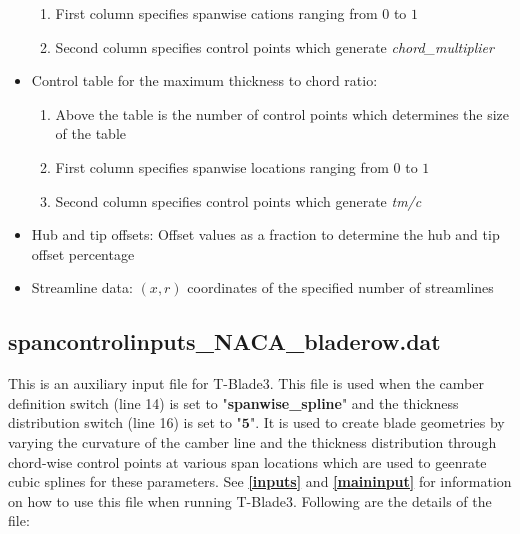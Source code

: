 \documentclass[8pt]{article}
\begin{document}
\begin{itemize}[leftmargin=*]
\begin{enumerate}[label=\alph*]
        \item First column specifies spanwise cations ranging from $0$ to $1$
        \item Second column specifies control points which generate \textit{chord\_multiplier}
    \end{enumerate}
    \item Control table for the maximum thickness to chord ratio:
    \begin{enumerate}[label=\alph*]
        \item Above the table is the number of control points which determines the size of the table
        \item First column specifies spanwise locations ranging from $0$ to $1$
        \item Second column specifies control points which generate \textit{tm/c}
    \end{enumerate}
    \item Hub and tip offsets: Offset values as a fraction to determine the hub and tip offset percentage
    \item Streamline data: $(x,r)$ coordinates of the specified number of streamlines
\end{itemize}

\subsection{spancontrolinputs\_NACA\_bladerow.dat}\label{auxinput_NACA}
\noindent
This is an auxiliary input file for T-Blade3. This file is used when the camber definition switch (line 14) is set to "\textbf{spanwise\_spline}" and the thickness distribution switch (line 16) is set to "$\mathbf{5}$". It is used to create blade geometries by varying the curvature of the camber line and the thickness distribution through chord-wise control points at various span locations which are used to geenrate cubic splines for these parameters. See \textbf{\ref{inputs}} and \textbf{\ref{maininput}} for information on how to use this file when running T-Blade3. Following are the details of the file:
\end{document}
